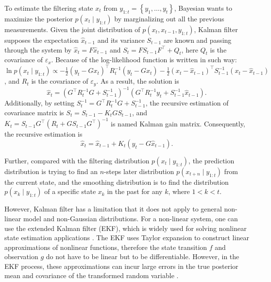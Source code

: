 To estimate the filtering state $x_t$ from $y_{1:t}=\left\lbrace y_1,\ldots,y_t\right\rbrace$, Bayesian wants to maximize the posterior $p(x_t\mid y_{1:t})$ by marginalizing out all the previous measurements. Given the joint distribution of $p(x_t,x_{t-1},y_{1:t})$, Kalman filter supposes the expectation $\hat{x}_{t-1}$ and its variance $S_{t-1}$ are known and passing through the system by $\hat{x}_t=F\hat{x}_{t-1}$ and $S_t=FS_{t-1}F^\top + Q_t$, here $Q_t$ is the covariance of $\varepsilon_x$. Because of the log-likelihood function is written in such way: 
$\ln p(x_t\mid y_{1:t}) \propto -\frac{1}{2}(y_t-Gx_t)^\top R_t^{-1}(y_t-Gx_t)-\frac{1}{2}(x_t-\hat{x}_{t-1})^\top S_{t-1}^{-1}(x_t-\hat{x}_{t-1})$, and $R_t$ is the covariance of $\varepsilon_y$. As a result, the solution is 
\begin{equation}
\hat{x}_t = \left(G^\top R_t^{-1}G+S_{t-1}^{-1}\right)^{-1}\left( G^\top R_t^{-1}y_t+S_{t-1}^{-1}\hat{x}_{t-1} \right).
\end{equation}
Additionally, by setting $S_t^{-1} = G^\top R_t^{-1}G+S_{t-1}^{-1}$, the recursive estimation of covariance matrix is $S_t = S_{t-1} - K_t GS_{t-1}$, 
and $K_t = S_{t-1} G^\top (R_t +GS_{t-1}G^\top)^{-1}$ is named Kalman gain matrix. Consequently, the recursive estimation is 
\begin{equation}\label{KalmanEstimation}
\hat{x}_t = \hat{x}_{t-1}+K_t(y_t-G\hat{x}_{t-1}).
\end{equation}

Further, compared with the filtering distribution $p(x_t\mid y_{1:t})$, the prediction distribution is trying to find an $n$-steps later distribution $p(x_{t+n}\mid y_{1:t})$ from the current state, and the smoothing distribution is to find the distribution $p(x_k\mid y_{1:t})$ of a specific state $x_k$ in the past for any $k$, where $1<k<t$. 

However, Kalman filter has a limitation that it does not apply to general non-linear model and non-Gaussian distributions. For a non-linear system, one can use the extended Kalman filter (EKF), which is widely used for solving nonlinear state estimation applications \citep{gelb1974applied, bar1993estimation}. The EKF uses Taylor expansion to construct linear approximations of nonlinear functions, therefore the state transition $f$ and observation $g$ do not have to be linear but to be differentiable. However, in the EKF process, these approximations can incur large errors in the true posterior mean and covariance of the transformed random variable \citep{wan2000unscented}. 

